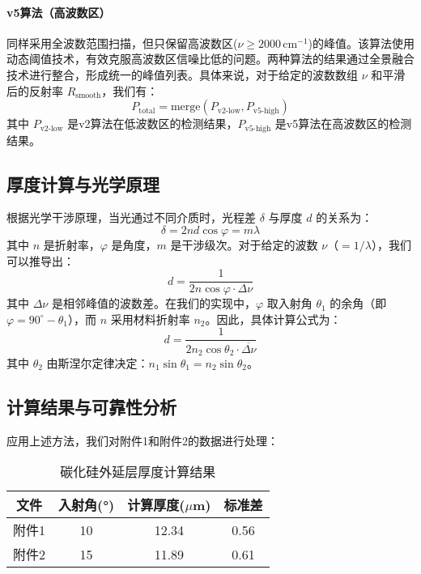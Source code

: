 \documentclass{ctexart} %
\begin{document}
\paragraph{v5算法（高波数区）}
同样采用全波数范围扫描，但只保留高波数区($\nu\geq 2000\,\mathrm{cm}^{-1}$)的峰值。该算法使用动态阈值技术，有效克服高波数区信噪比低的问题。两种算法的结果通过全景融合技术进行整合，形成统一的峰值列表。具体来说，对于给定的波数数组 $\nu$ 和平滑后的反射率 $R_{\text{smooth}}$，我们有：
\begin{equation}
    P_{\text{total}} = \text{merge}(P_{\text{v2-low}}, P_{\text{v5-high}})
\end{equation}
其中 $P_{\text{v2-low}}$ 是v2算法在低波数区的检测结果，$P_{\text{v5-high}}$ 是v5算法在高波数区的检测结果。 \subsection{厚度计算与光学原理}
\label{subsec:thickness-calculation} 根据光学干涉原理，当光通过不同介质时，光程差 $\delta$ 与厚度 $d$ 的关系为：
\begin{equation}
    \delta = 2n d \cos\varphi = m\lambda
\end{equation}
其中 $n$ 是折射率，$\varphi$ 是角度，$m$ 是干涉级次。对于给定的波数 $\nu$（$=1/\lambda$），我们可以推导出：
\begin{equation}
    d = \frac{1}{2n \cos\varphi \cdot \Delta\nu}
\end{equation}
其中 $\Delta\nu$ 是相邻峰值的波数差。在我们的实现中，$\varphi$ 取入射角 $\theta_1$ 的余角（即 $\varphi=90^\circ-\theta_1$），而 $n$ 采用材料折射率 $n_2$。因此，具体计算公式为：
\begin{equation}
    d = \frac{1}{2n_2 \cos\theta_2 \cdot \overline{\Delta\nu}}
\end{equation}
其中 $\theta_2$ 由斯涅尔定律决定：$n_1\sin\theta_1=n_2\sin\theta_2$。  \subsection{计算结果与可靠性分析}
\label{subsec:results} 应用上述方法，我们对附件1和附件2的数据进行处理：

\begin{table}[H]
    \centering
    \caption{碳化硅外延层厚度计算结果}
    \begin{tabular}{cccc}
        \hline
        文件  & 入射角(°) & 计算厚度($\mu$m) & 标准差  \\
        \hline
        附件1 & 10     & 12.34        & 0.56 \\
        附件2 & 15     & 11.89        & 0.61 \\
        \hline
    \end{tabular}
\end{table}
\end{document}
